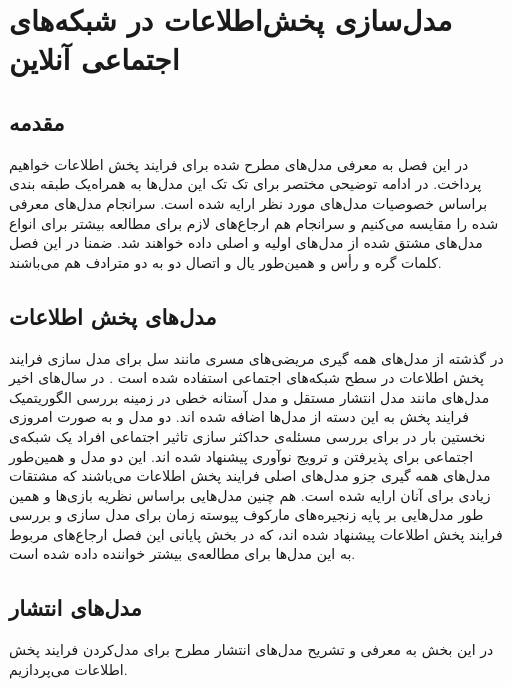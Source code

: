\chapter{مدل‌سازی پخش‌اطلاعات در شبکه‌های اجتماعی آنلاین}
\newpage
\begin{persian}
\section {مقدمه}
\noindent
در این فصل به معرفی مدل‌های مطرح شده برای فرایند پخش اطلاعات خواهیم پرداخت. در ادامه توضیحی مختصر برای تک تک این مدل‌ها به همراه‌یک طبقه بندی براساس خصوصیات مدل‌های مورد نظر ارایه شده است. سرانجام مدل‌های معرفی شده را مقایسه می‌کنیم و سرانجام هم ارجاع‌های لازم برای مطالعه بیشتر برای انواع مدل‌های مشتق شده از مدل‌های اولیه و اصلی داده خواهند شد. ضمنا در این فصل کلمات گره و رأس و همین‌طور یال و اتصال دو به دو مترادف هم می‌باشند.
\section {مدل‌های پخش اطلاعات}
\noindent
در گذشته از مدل‌های همه گیری مریضی‌های مسری مانند سل برای مدل سازی فرایند پخش اطلاعات در سطح شبکه‌های اجتماعی استفاده شده است \cite{watts_six_2004,easley_networks_2010}. در سال‌های اخیر مدل‌های مانند مدل انتشار مستقل 
و مدل آستانه خطی
در زمینه بررسی الگوریتمیک فرایند پخش به این دسته از مدل‌ها اضافه شده اند. دو مدل  و  به صورت امروزی نخستین بار در \cite {kempe_maximizing_2003} برای بررسی مسئله‌ی حداکثر سازی تاثیر اجتماعی افراد یک شبکه‌ی اجتماعی برای پذیرفتن و ترویج نوآوری پیشنهاد شده اند.
این دو مدل و همین‌طور مدل‌های همه گیری جزو مدل‌های اصلی فرایند پخش اطلاعات می‌باشند که مشتقات زیادی برای آنان ارایه شده است. هم چنین مدل‌هایی براساس نظریه بازی‌ها \cite{jiang_evolutionary_2013} و همین طور مدل‌هایی بر پایه زنجیره‌های مارکوف پیوسته زمان برای مدل سازی و بررسی فرایند پخش اطلاعات پیشنهاد شده اند، که در بخش پایانی این فصل ارجاع‌های مربوط به این مدل‌ها برای مطالعه‌ی بیشتر خواننده داده شده است. 
\\


\section{مدل‌های انتشار}
\noindent
{
در این بخش به معرفی و تشریح مدل‌های انتشار مطرح برای مدل‌کردن فرایند پخش اطلاعات می‌پردازیم. 
}

\end{persian}
